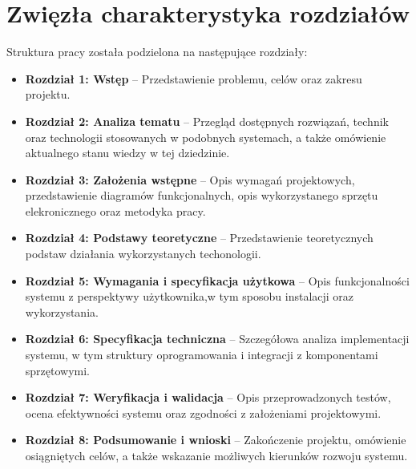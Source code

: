 \section{Zwięzła charakterystyka rozdziałów}
\label{sec:charakterystyka}

Struktura pracy została podzielona na następujące rozdziały:

\begin{itemize}
    \item \textbf{Rozdział 1: Wstęp} – Przedstawienie problemu, celów oraz zakresu projektu.
    \item \textbf{Rozdział 2: Analiza tematu} – Przegląd dostępnych rozwiązań, technik oraz technologii stosowanych w podobnych systemach, a także omówienie aktualnego stanu wiedzy w tej dziedzinie.
    \item \textbf{Rozdział 3: Założenia wstępne} – Opis wymagań projektowych, przedstawienie diagramów funkcjonalnych, opis wykorzystanego sprzętu elekronicznego oraz metodyka pracy. 
    \item \textbf{Rozdział 4: Podstawy teoretyczne} – Przedstawienie teoretycznych podstaw działania wykorzystanych techonologii. 
    \item \textbf{Rozdział 5: Wymagania i specyfikacja użytkowa} – Opis funkcjonalności systemu z perspektywy użytkownika,w tym sposobu instalacji oraz wykorzystania. 
    \item \textbf{Rozdział 6: Specyfikacja techniczna} – Szczegółowa analiza implementacji systemu, w tym struktury oprogramowania i integracji z komponentami sprzętowymi.
    \item \textbf{Rozdział 7: Weryfikacja i walidacja} – Opis przeprowadzonych testów, ocena efektywności systemu oraz zgodności z założeniami projektowymi.
    \item \textbf{Rozdział 8: Podsumowanie i wnioski} – Zakończenie projektu, omówienie osiągniętych celów, a także wskazanie możliwych kierunków rozwoju systemu.
\end{itemize}


